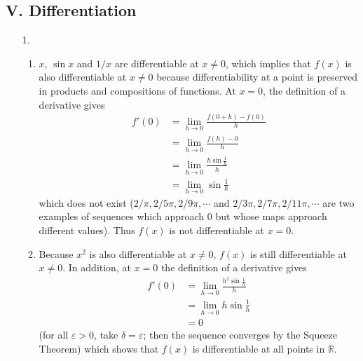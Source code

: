 \documentclass[a4paper,12pt]{article}
\begin{document}
    \subsection*{V. Differentiation}
    \begin{enumerate}
        \item[1.]
            \begin{enumerate}
                \item
                    $x$, $\sin x$ and $1/x$ are differentiable at $x \neq 0$, which implies that $f(x)$ is also differentiable at $x \neq 0$ because differentiability at a point is preserved in products and compositions of functions. At $x = 0$, the definition of a derivative gives
                    \begin{align*}
                        f'(0) &= \lim_{h \to 0} \frac{f(0 + h) - f(0)}{h} \\
                        &= \lim_{h \to 0} \frac{f(h) - 0}{h} \\
                        &= \lim_{h \to 0} \frac{h \sin{\frac{1}{h}}}{h} \\
                        &= \lim_{h \to 0} \sin{\frac{1}{h}}
                    \end{align*}
                    which does not exist ($2/\pi, 2/5\pi, 2/9\pi, \cdots$ and $2/3\pi, 2/7\pi, 2/11\pi, \cdots$ are two examples of sequences which approach $0$ but whose maps approach different values). Thus $f(x)$ is not differentiable at $x = 0$.

                \item
                    Because $x^2$ is also differentiable at $x \neq 0$, $f(x)$ is still differentiable at $x \neq 0$. In addition, at $x = 0$ the definition of a derivative gives
                    \begin{align*}
                        f'(0) &= \lim_{h \to 0} \frac{h^2 \sin{\frac{1}{h}}}{h} \\
                        &= \lim_{h \to 0} h\sin{\frac{1}{h}} \\
                        &= 0
                    \end{align*}
                    (for all $\varepsilon > 0$, take $\delta = \varepsilon$; then the sequence converges by the Squeeze Theorem) which shows that $f(x)$ is differentiable at all points in $\mathbb{R}$.


\end{enumerate}
\end{enumerate}
\end{document}

